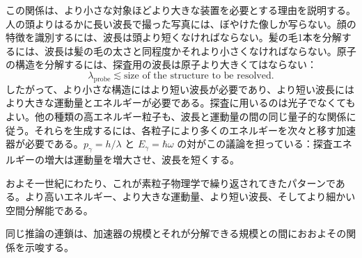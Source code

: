 この関係は、より小さな対象ほどより大きな装置を必要とする理由を説明する。人の頭よりはるかに長い波長で撮った写真には、ぼやけた像しか写らない。顔の特徴を識別するには、波長は頭より短くなければならない。髪の毛1本を分解するには、波長は髪の毛の太さと同程度かそれより小さくなければならない。原子の構造を分解するには、探査用の波長は原子より大きくてはならない：
\begin{equation}
\lambda_{\mathrm{probe}}\lesssim
\text{size of the structure to be resolved}.
\end{equation}
したがって、より小さな構造にはより短い波長が必要であり、より短い波長にはより大きな運動量とエネルギーが必要である。探査に用いるのは光子でなくてもよい。他の種類の高エネルギー粒子も、波長と運動量の間の同じ量子的な関係に従う。それらを生成するには、各粒子により多くのエネルギーを次々と移す加速器が必要である。\(p_\gamma=h/\lambda\) と \(E_\gamma=\hbar\omega\) の対がこの議論を担っている：探査エネルギーの増大は運動量を増大させ、波長を短くする。

およそ一世紀にわたり、これが素粒子物理学で繰り返されてきたパターンである。より高いエネルギー、より大きな運動量、より短い波長、そしてより細かい空間分解能である。

\begin{classroomqa}
\end{classroomqa}

同じ推論の連鎖は、加速器の規模とそれが分解できる規模との間におおよその関係を示唆する。

\begin{classroomqa}
\end{classroomqa}


